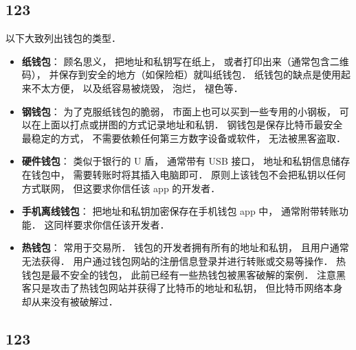 \subsection{123}
以下大致列出钱包的类型．
\begin{itemize}
\item \textbf{纸钱包}： 顾名思义， 把地址和私钥写在纸上， 或者打印出来（通常包含二维码）， 并保存到安全的地方（如保险柜）就叫纸钱包． 纸钱包的缺点是使用起来不太方便， 以及纸容易被烧毁， 泡烂， 褪色等．
\item \textbf{钢钱包}： 为了克服纸钱包的脆弱， 市面上也可以买到一些专用的小钢板， 可以在上面以打点或拼图的方式记录地址和私钥． 钢钱包是保存比特币最安全最稳定的方式， 不需要依赖任何第三方数字设备或软件， 无法被黑客盗取．
\item \textbf{硬件钱包}： 类似于银行的 U 盾， 通常带有 USB 接口， 地址和私钥信息储存在钱包中， 需要转账时将其插入电脑即可． 原则上该钱包不会把私钥以任何方式联网， 但这要求你信任该 app 的开发者．
\item \textbf{手机离线钱包}： 把地址和私钥加密保存在手机钱包 app 中， 通常附带转账功能． 这同样要求你信任该开发者．
\item \textbf{热钱包}： 常用于交易所． 钱包的开发者拥有所有的地址和私钥， 且用户通常无法获得． 用户通过钱包网站的注册信息登录并进行转账或交易等操作． 热钱包是最不安全的钱包， 此前已经有一些热钱包被黑客破解的案例． 注意黑客只是攻击了热钱包网站并获得了比特币的地址和私钥， 但比特币网络本身却从来没有被破解过．
\end{itemize}

\subsection{123}
